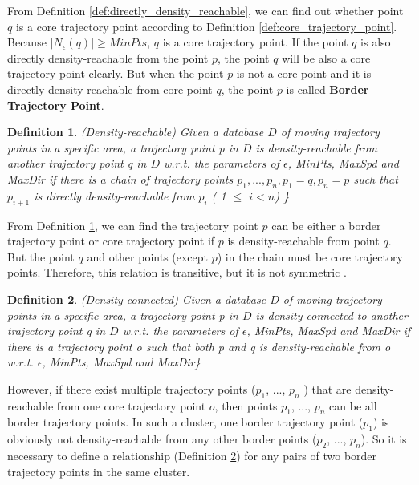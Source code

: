 \documentclass[12pt,glossary]{dalcsthesis}
\newtheorem{definition}{Definition}
\begin{document}
From Definition \ref{def:directly_density_reachable}, we can find out whether point $q$ is a core trajectory point according to Definition \ref{def:core_trajectory_point}. Because $\left|N_{\epsilon}(q)\right| \geq MinPts$, $q$ is a core trajectory point. If the point $q$ is also directly density-reachable from the point $p$, the point $q$ will be also a core trajectory point clearly. But when the point $p$ is not a core point and it is directly density-reachable from core point $q$, the point $p$ is called \textbf{Border Trajectory Point}.

\begin{definition}
\label{def:density_reachable}
(Density-reachable)
Given a database $D$ of moving trajectory points in a specific area, a trajectory point p in $D$ is density-reachable from another trajectory point q in $D$ w.r.t. the parameters of $\epsilon$, MinPts, MaxSpd and MaxDir if there is a chain of trajectory points $p_1,..., p_n, p_1 = q, p_n = p$ such that $p_{i+1}$ is directly density-reachable from $p_i$  ( 1 $\leq$ $i<n$) \}
\end{definition}

From Definition \ref{def:density_reachable}, we can find the trajectory point $p$ can be either a border trajectory point or core trajectory point if $p$ is density-reachable from point $q$. But the point $q$ and other points (except $p$) in the chain must be core trajectory points. Therefore, this relation is transitive, but it is not symmetric \cite{DBScan96}.


\begin{definition}
\label{def:density_connected}
(Density-connected)
Given a database $D$ of moving trajectory points in a specific area, a trajectory point p in $D$ is density-connected to another trajectory point q in $D$ w.r.t. the parameters of $\epsilon$, MinPts, MaxSpd and MaxDir if there is a trajectory point o such that both p and q is density-reachable from o w.r.t.  $\epsilon$, MinPts, MaxSpd and MaxDir\}
\end{definition}

However, if there exist multiple trajectory points ($p_1$, ..., $p_n$ ) that are density-reachable from one core trajectory point $o$, then points $p_1$, ..., $p_n$ can be all border trajectory points.  In such a cluster, one border trajectory point ($p_1$) is obviously not density-reachable from any other border points ($p_2$, ..., $p_n$). So it is necessary to define a relationship (Definition \ref{def:density_connected}) for any pairs of two border trajectory points in the same cluster.
\end{document}

